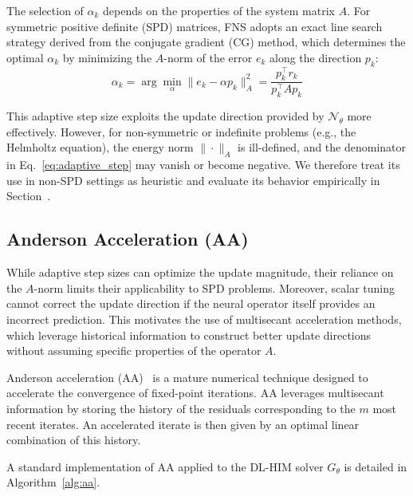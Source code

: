 \documentclass[11pt]{article}
\begin{document}
The selection of $\alpha_k$ depends on the properties of the system matrix $A$. For symmetric positive definite (SPD) matrices, FNS adopts an exact line search strategy derived from the conjugate gradient (CG) method, which determines the optimal $\alpha_k$ by minimizing the $A$-norm of the error $e_k$ along the direction $p_k$:
\begin{equation}\label{eq:adaptive_step}
    \alpha_k = \arg \min_{\alpha} \|e_{k} - \alpha p_k\|^2_A = \frac{p_k^\top r_k}{p_k^\top A p_k}
\end{equation}

This adaptive step size exploits the update direction provided by $\mathcal{N}_\theta$ more effectively. However, for non-symmetric or indefinite problems (e.g., the Helmholtz equation), the energy norm $\|\cdot\|_A$ is ill-defined, and the denominator in Eq.~\eqref{eq:adaptive_step} may vanish or become negative. We therefore treat its use in non-SPD settings as heuristic and evaluate its behavior empirically in Section~.

\subsection{Anderson Acceleration (AA)}
While adaptive step sizes can optimize the update magnitude, their reliance on the $A$-norm limits their applicability to SPD problems. Moreover, scalar tuning cannot correct the update direction if the neural operator itself provides an incorrect prediction. This motivates the use of multisecant acceleration methods, which leverage historical information to construct better update directions without assuming specific properties of the operator $A$.

Anderson acceleration (AA)~\cite{walker2011anderson} is a mature numerical technique designed to accelerate the convergence of fixed-point iterations. AA leverages multisecant information by storing the history of the residuals corresponding to the $m$ most recent iterates. An accelerated iterate is then given by an optimal linear combination of this history.

A standard implementation of AA applied to the DL-HIM solver $G_\theta$ is detailed in Algorithm~\ref{alg:aa}.
\end{document}
